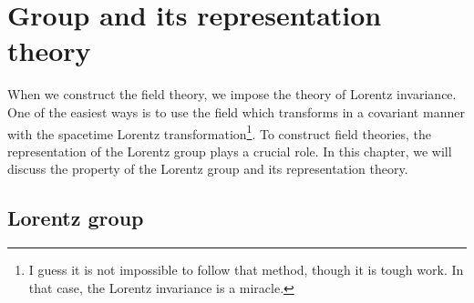 \documentclass[a4paper,pdftex,10pt]{report}
\begin{document}
\maketitle

\tableofcontents

\clearpage
\chapter{Group and its representation theory}

When we construct the field theory, we impose the theory of Lorentz invariance. One of the easiest ways is to use the field which transforms in a covariant manner with the spacetime Lorentz transformation\footnote{
  I guess it is not impossible to follow that method, though it is tough work. In that case, the Lorentz invariance is a miracle.
}. To construct field theories, the representation of the Lorentz group plays a crucial role. In this chapter, we will discuss the property of the Lorentz group and its representation theory. 

\section{Lorentz group}
\end{document}
